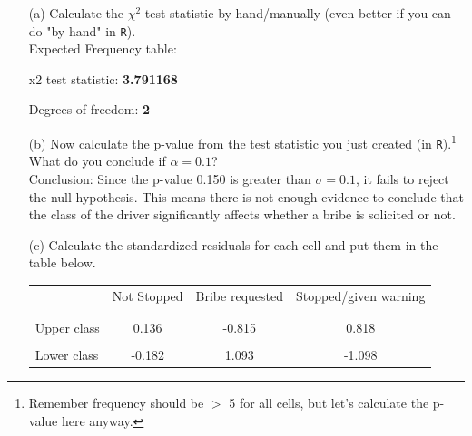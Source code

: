 \documentclass[12pt,letterpaper]{article}
\begin{document}
\begin{enumerate}
	
	\item [(a)]
	Calculate the $\chi^2$ test statistic by hand/manually (even better if you can do "by hand" in \texttt{R}).\\

	
		  
		
		Expected Frequency table:
		
		
		
	
		x2 test statistic: \textbf{3.791168} 
		
		\vspace{0.5cm}
			
		Degrees of freedom: \textbf{2} 
	
		\vspace{0.5cm}
	
	\item [(b)]
	Now calculate the p-value from the test statistic you just created (in \texttt{R}).\footnote{Remember frequency should be $>$ 5 for all cells, but let's calculate the p-value here anyway.}  What do you conclude if $\alpha = 0.1$?\\
	
			  
		
			\vspace{0.3cm}
			Conclusion:
			Since the p-value 0.150 is greater than $\sigma = 0.1$, it fails to reject the null hypothesis. This means there is not enough evidence to conclude that the class of the driver significantly affects whether a bribe is solicited or not.

\newpage

	\item [(c)] Calculate the standardized residuals for each cell and put them in the table below.
	\vspace{0.3cm}
	
		  
	

	\begin{table}[h]
		\centering
		\begin{tabular}{l | c c c }
			& Not Stopped & Bribe requested & Stopped/given warning \\
			\\[-1.8ex] 
			\hline \\[-1.8ex]
			Upper class  & 0.136 & -0.815 & 0.818 \\
			\\
			Lower class & -0.182 & 1.093  & -1.098  \\
			

\end{tabular}
\end{table}
\end{enumerate}
\end{document}
